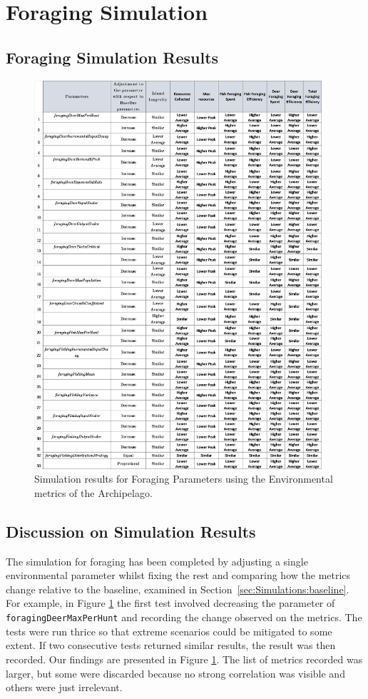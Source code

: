 \section{Foraging Simulation}
\subsection{Foraging Simulation Results}
\begin{figure}[!htb]
    \centering
    \includegraphics[width=0.95\textwidth]{16_results_and_eval/images/ForageCommonSim.png}
    \caption{Simulation results for Foraging Parameters using the Environmental metrics of the Archipelago.}
    \label{fig:Resource}
\end{figure}
\subsection{Discussion on Simulation Results}
The simulation for foraging has been completed by adjusting a single environmental parameter whilst fixing the rest and comparing how the metrics change relative to the baseline, examined in Section~\ref{sec:Simulations:baseline}. For example, in Figure \ref{fig:Resource} the first test involved decreasing the parameter of \texttt{foragingDeerMaxPerHunt} and recording the change observed on the metrics. The tests were run thrice so that extreme scenarios could be mitigated to some extent. If two consecutive tests returned similar results, the result was then recorded. Our findings are presented in Figure \ref{fig:Resource}. The list of metrics recorded was larger, but some were discarded because no strong correlation was visible and others were just irrelevant. 

